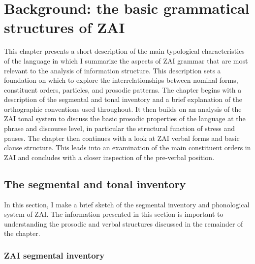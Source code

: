 \chapter{Background: the basic grammatical structures of ZAI}\label{backgroundchapter}


This chapter presents a short description of the main typological characteristics of the language in which I summarize the aspects of ZAI grammar that are most relevant to the analysis of information structure. This description sets a foundation on which to explore the interrelationships between nominal forms, constituent orders, particles, and prosodic patterns. The chapter begins with a description of the segmental and tonal inventory and a brief explanation of the orthographic conventions used throughout. It then builds on an analysis of the ZAI tonal system to discuss the basic prosodic properties of the language at the phrase and discourse level, in particular the structural function of stress and pauses. The chapter then continues with a look at ZAI verbal forms and basic clause structure. This leads into an examination of the main constituent orders in ZAI and concludes with a closer inspection of the pre-verbal position. 



\section{The segmental and tonal inventory}\label{briefsketch}


In this section, I make a brief sketch of the segmental inventory and phonological system of ZAI. The information presented in this section is important to understanding the prosodic and verbal structures discussed in the remainder of the chapter.

 
\subsection{ZAI segmental inventory}

